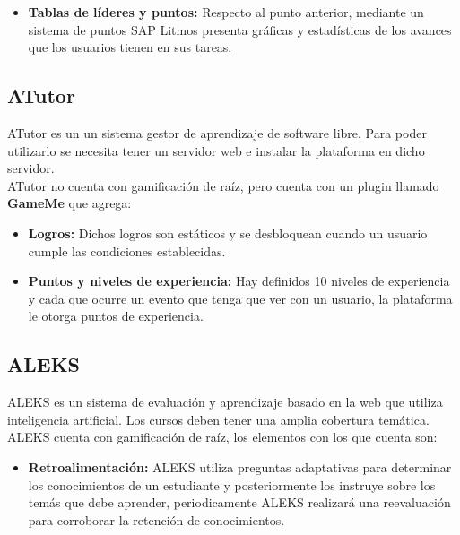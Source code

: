 \begin{multicols*}{2}
\begin{itemize}
        \item {\bf Tablas de líderes y puntos: } Respecto al punto anterior,
        mediante un sistema de puntos SAP Litmos presenta gráficas y estadísticas
        de los avances que los usuarios tienen en sus tareas.

    \end{itemize}


\subsection{ATutor}

 ATutor \cite{PagATutor} es un un sistema gestor de aprendizaje de software libre. Para poder
 utilizarlo se necesita tener un servidor web e instalar la plataforma en dicho servidor.\\

    \noindent ATutor no cuenta con gamificación de raíz,
    pero cuenta con un plugin llamado \textbf{GameMe} que agrega:

    \begin{itemize}
        \item {\bf Logros:} Dichos logros son estáticos y se
        desbloquean cuando un usuario cumple las condiciones
        establecidas.

        \item {\bf Puntos y niveles de experiencia:} Hay definidos 10
        niveles de experiencia y cada que ocurre un evento que tenga
        que ver con un usuario, la plataforma le otorga puntos de
        experiencia.

    \end{itemize}



\subsection{ALEKS}

 ALEKS \cite{PagALEKS} es un sistema de evaluación y aprendizaje basado en la web que
 utiliza inteligencia artificial. Los cursos deben tener una amplia cobertura temática.\\

 \noindent ALEKS cuenta con gamificación de raíz, los elementos con los que cuenta son:

    \begin{itemize}
        \item {\bf Retroalimentación:} ALEKS utiliza preguntas adaptativas para
            determinar los conocimientos de un estudiante y posteriormente los instruye
            sobre los temás que debe aprender, periodicamente ALEKS realizará una
            reevaluación para corroborar la retención de conocimientos.


\end{itemize}
\end{multicols*}
